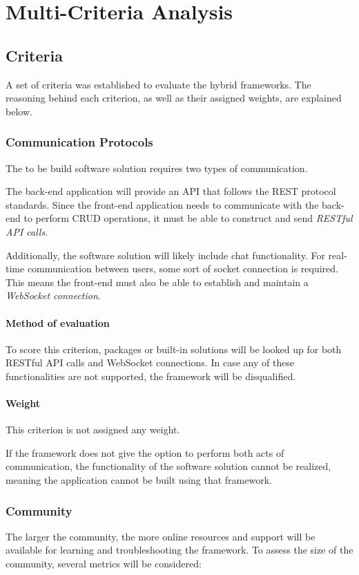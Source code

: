 \section{Multi-Criteria Analysis}\label{sec:multi-criteria-analysis}

\subsection{Criteria}\label{subsec:criteria}
A set of criteria was established to evaluate the hybrid frameworks.
The reasoning behind each criterion, as well as their assigned weights, are explained below.

\subsubsection{Communication Protocols}\label{subsubsec:communication-protocols}
The to be build software solution requires two types of communication.

The back-end application will provide an API that follows the REST protocol standards.
Since the front-end application needs to communicate with the back-end to perform CRUD operations, it must be able to construct and send \emph{RESTful API calls}.

Additionally, the software solution will likely include chat functionality.
For real-time communication between users, some sort of socket connection is required.
This means the front-end must also be able to establish and maintain a \emph{WebSocket connection}.

\paragraph{Method of evaluation}
To score this criterion, packages or built-in solutions will be looked up for both RESTful API calls and WebSocket connections.
In case any of these functionalities are not supported, the framework will be disqualified.

\paragraph{Weight}
This criterion is not assigned any weight.

If the framework does not give the option to perform both acts of communication, the functionality of the software solution cannot be realized, meaning the application cannot be built using that framework.

\subsubsection{Community}\label{subsubsec:community}
The larger the community, the more online resources and support will be available for learning and troubleshooting the framework.
To assess the size of the community, several metrics will be considered:

